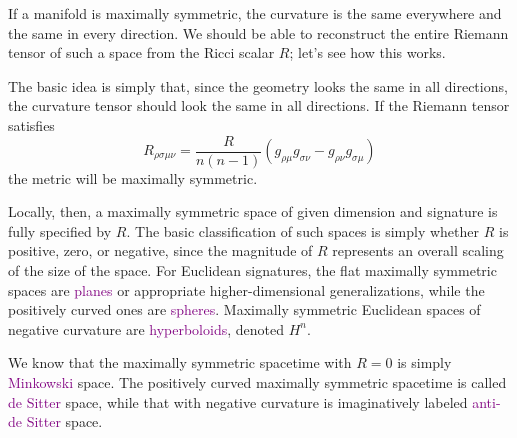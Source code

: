 If a manifold is maximally symmetric, the curvature is the same everywhere and the same in every direction. We should be able to reconstruct the entire Riemann tensor of such a space from the Ricci scalar $R$; let's see how this works.

The basic idea is simply that, since the geometry looks the same in all directions, the curvature tensor should look the same in all directions. If the Riemann tensor satisfies
\begin{equation*}
    R_{\rho\sigma\mu\nu}=\frac{R}{n(n-1)}(g_{\rho\mu}g_{\sigma\nu}-g_{\rho\nu}g_{\sigma\mu})
\end{equation*}
the metric will be maximally symmetric.

Locally, then, a maximally symmetric space of given dimension and signature is  fully specified by $R$. The basic classification of such spaces is simply whether $R$ is positive, zero, or negative, since the magnitude of $R$ represents an overall scaling of the size of the space. For Euclidean signatures, the flat maximally symmetric spaces are \textcolor{purple}{planes} or appropriate higher-dimensional generalizations, while the positively curved ones are \textcolor{purple}{spheres}. Maximally symmetric Euclidean spaces of negative curvature are \textcolor{purple}{hyperboloids}, denoted $H^n$.

We know that the maximally symmetric spacetime with $R=0$ is simply \textcolor{purple}{Minkowski} space. The positively curved maximally symmetric spacetime is called \textcolor{purple}{de Sitter} space, while that with negative curvature is imaginatively labeled \textcolor{purple}{anti-de Sitter} space.